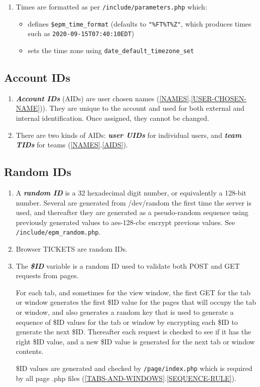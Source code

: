 \documentclass[12pt]{article}
\newcommand{\key}[1]{{\bf \em #1}}
\newcommand{\EOL}{\penalty \exhyphenpenalty}
\newcommand{\sref}[2]{(\ref{#1}.\ref{#2})}
\begin{document}
\begin{enumerate}
\item Times are formatted as per {\tt /include/parameters.php}
     which:
     \begin{itemize}
     \item defines {\tt \$epm\_time\_\EOL format}
           (defaults to {\tt "\%FT\%T\%Z"}, which
	    produces times such as {\tt 2020-09-15T07:40:10EDT})
     \item sets the time zone using
           {\tt date\_default\_\EOL timezone\_\EOL set}
     \end{itemize}

\end{enumerate}

\subsection{Account IDs}

\begin{enumerate}
\item \key{Account IDs}
      (AIDs) are user chosen names \sref{NAMES}{USER-CHOSEN-NAME}).
      They are unique to the
      account and used for both external and internal identification.
      Once assigned, they cannot be changed.
\item There are two kinds of AIDs: \key{user UIDs} for individual users,
      and \key{team TIDs} for teams \sref{NAMES}{AIDS}.
\end{enumerate}

\subsection{Random IDs}

\begin{enumerate}
\item A \key{random ID} is a 32 hexadecimal digit number, or equivalently
      a 128-bit number.  Several are generated from /dev/random
      the first time the server is used, and thereafter they
      are generated as a pseudo-random sequence using previously
      generated values to aes-128-cbc encrypt previous values.
      See {\tt /include/epm\_random.php}.
\item Browser TICKETS are random IDs.
\item The \key{\$ID} variable is a random ID used to validate
      both POST and GET requests from pages.
      
      For each tab, and
      sometimes for the view window, the first GET for the tab
      or window generates the first \$ID value for the pages
      that will occupy the tab or window, and also generates
      a random key that is used to generate a sequence
      of \$ID values for the tab or window by encrypting
      each \$ID to generate the next \$ID.  Thereafter each
      request is checked to see if it has the right \$ID value,
      and a new \$ID value is generated for the next tab or
      window contents.

      \$ID values are generated and checked by {\tt /page/index.php}
      which is required by all page .php files
      \sref{TABS-AND-WINDOWS}{SEQUENCE-RULE}.
\end{enumerate}
\end{document}
